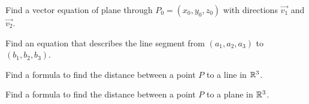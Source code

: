 \documentclass[12pt]{amsart}
\begin{document}
\begin{question}
	Find a vector equation of plane through $P_0 = (x_0, y_0, z_0)$ with directions $\vec{v_1}$ and $\vec{v_2}$.
\end{question}

\vspace{5cm}


\begin{question}
	Find an equation that describes the line segment from $(a_1, a_2, a_3)$ to $(b_1, b_2, b_3)$.
\end{question}

\vspace{5cm}

\begin{question}
	Find a formula to find the distance between a point $P$ to a line in $\mathbb{R}^3$.
\end{question}
\vspace{5cm}

\begin{question}
	Find a formula to find the distance between a point $P$ to a plane in $\mathbb{R}^3$.
\end{question}
\vspace{5cm}
\end{document}
